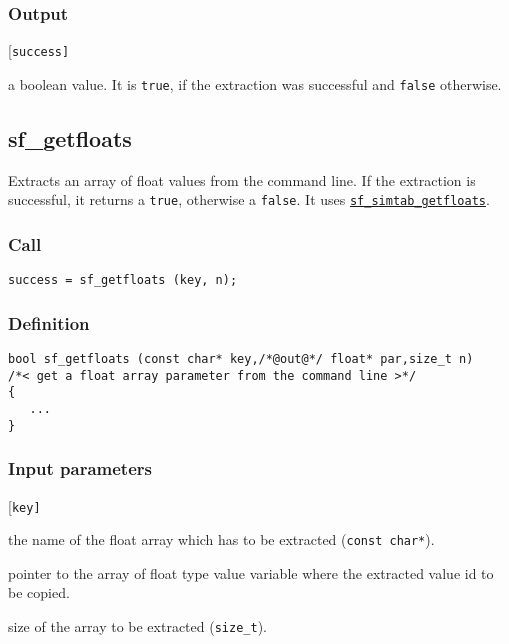 \subsubsection*{Output}
\begin{desclist}{\tt }{\quad}[\tt success]
   \setlength\itemsep{0pt}
   \item[success]  a boolean value. It is \texttt{true}, if the extraction was successful and \texttt{false} otherwise. 
\end{desclist}




\subsection{{sf\_getfloats}}
Extracts an array of float values from the command line. If the extraction is successful, it returns a \texttt{true}, otherwise a \texttt{false}.  It uses \hyperref[sec:sf_simtab_getfloats]{\texttt{sf\_simtab\_getfloats}}.

\subsubsection*{Call}
\begin{verbatim}success = sf_getfloats (key, n);\end{verbatim}

\subsubsection*{Definition}
\begin{verbatim}
bool sf_getfloats (const char* key,/*@out@*/ float* par,size_t n) 
/*< get a float array parameter from the command line >*/
{
   ... 
}
\end{verbatim}

\subsubsection*{Input parameters}
\begin{desclist}{\tt }{\quad}[\tt key]
   \setlength\itemsep{0pt}
   \item[key] the name of the float array which has to be extracted (\texttt{const char*}).
   \item[par] pointer to the array of float type value variable where the extracted value id to be copied. 
   \item[n] size of the array to be extracted (\texttt{size\_t}).
\end{desclist}

